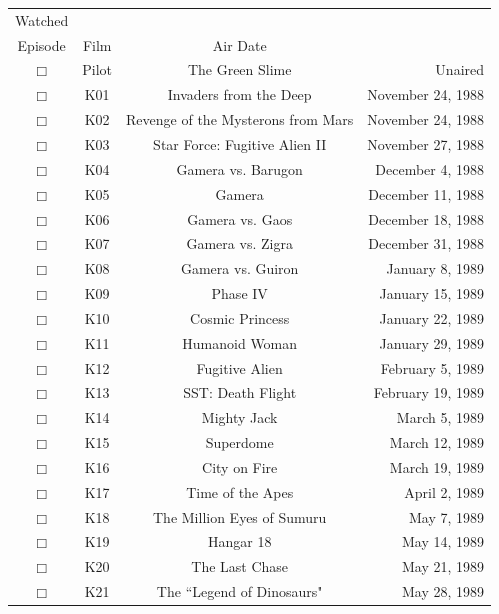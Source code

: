 \documentclass[12pt]{article}
\begin{document}
\begin{center}\begin{longtable}[c]{cccr}  %
Watched&\begin{tabular}{@{}c@{}}Season/\\Episode\end{tabular}&Film&Air Date\\\hline  %

$\Box$&Pilot&The Green Slime&Unaired\\
$\Box$&K01&Invaders from the Deep&November 24, 1988\\
$\Box$&K02&Revenge of the Mysterons from Mars&November 24, 1988\\
$\Box$&K03&Star Force: Fugitive Alien II&November 27, 1988\\
$\Box$&K04&Gamera vs. Barugon&December  4, 1988\\
$\Box$&K05&Gamera&December 11, 1988\\
$\Box$&K06&Gamera vs. Gaos&December 18, 1988\\
$\Box$&K07&Gamera vs. Zigra&December 31, 1988\\
$\Box$&K08&Gamera vs. Guiron&January  8, 1989\\
$\Box$&K09&Phase IV&January 15, 1989\\
$\Box$&K10&Cosmic Princess&January 22, 1989\\
$\Box$&K11&Humanoid Woman&January 29, 1989\\
$\Box$&K12&Fugitive Alien&February  5, 1989\\
$\Box$&K13&SST: Death Flight&February 19, 1989\\
$\Box$&K14&Mighty Jack&March  5, 1989\\
$\Box$&K15&Superdome&March 12, 1989\\
$\Box$&K16&City on Fire&March 19, 1989\\
$\Box$&K17&Time of the Apes&April  2, 1989\\
$\Box$&K18&The Million Eyes of Sumuru&May  7, 1989\\
$\Box$&K19&Hangar 18&May 14, 1989\\
$\Box$&K20&The Last Chase&May 21, 1989\\
$\Box$&K21&The ``Legend of Dinosaurs"&May 28, 1989\\  %


\end{longtable}
\end{center}
\end{document}
